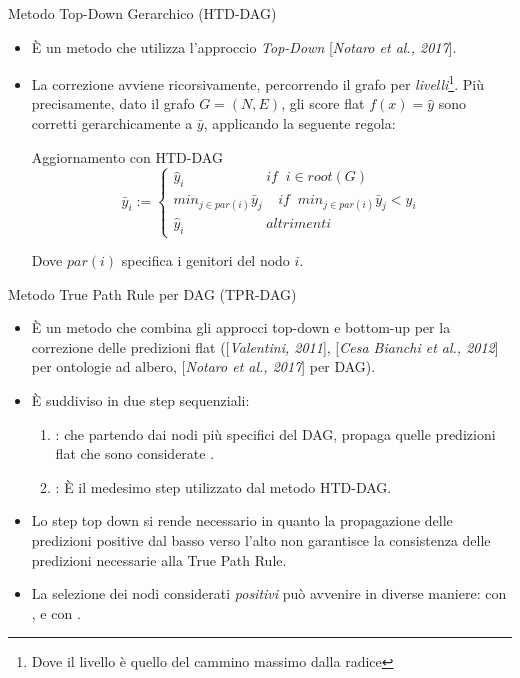 \documentclass[9pt]{beamer}
\begin{document}
\begin{tframe}{Metodo Top-Down Gerarchico (HTD-DAG)}
\begin{itemize}

\item È un metodo che utilizza l'approccio \emph{Top-Down} [\emph{Notaro et al., 2017}].
\item La correzione avviene ricorsivamente, percorrendo il grafo per \emph{livelli}\footnote{\footnotesize{Dove il livello è quello del cammino massimo dalla radice}}. Più precisamente, dato il grafo $G = (N, E)$, gli score flat $f(x) = \hat{y}$ sono corretti gerarchicamente a $\bar{y}$, applicando la seguente regola:
\begin{block}{Aggiornamento con HTD-DAG}
\[
\bar{y}_i := 
\begin{cases}
\hat{y}_i \;\;\;\;\;\;\;\;\;\;\;\;\;\;\;\;\;\;\;\;\; if\;\; i \in root(G)\\
min_{j \in par(i)} \bar{y}_j \;\;\;\; if \;\; min_{j \in par(i)}\bar{y}_j < \hat{y}_i\\
\hat{y}_i \;\;\;\;\;\;\;\;\;\;\;\;\;\;\;\;\;\;\;\;\; altrimenti
\end{cases}
\]
\end{block}
Dove $par(i)$ specifica i genitori del nodo $i$.
\end{itemize} 
\end{tframe}

\begin{tframe}{Metodo True Path Rule per DAG (TPR-DAG)}
\begin{itemize}
\item È un metodo che combina gli approcci top-down e bottom-up per la correzione delle predizioni flat ([\emph{Valentini, 2011}], [\emph{Cesa Bianchi et al., 2012}] per ontologie ad albero, [\emph{Notaro et al., 2017}] per DAG). 
\item È suddiviso in due step sequenziali:
\begin{enumerate}
\item {}: che partendo dai nodi più specifici del DAG, propaga quelle predizioni flat che sono considerate .
\item {}: È il medesimo step utilizzato dal metodo HTD-DAG.
\end{enumerate}
\item Lo step top down si rende necessario in quanto la propagazione delle predizioni positive dal basso verso l’alto non garantisce la consistenza delle predizioni necessarie alla True Path Rule. 
\item La selezione dei nodi considerati \emph{positivi} può avvenire in diverse maniere: con ,  e con .
\end{itemize}
\end{tframe}
\end{document}
